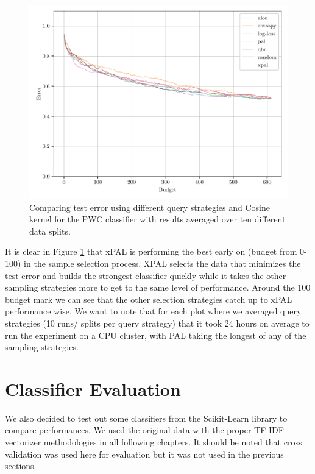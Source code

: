 \begin{figure}[ht]
    \centering
    \includegraphics[width=\scale\textwidth]{../img/plot_kernel_cos_averaged_test_results.pdf}
    \caption{Comparing test error using different query strategies and Cosine kernel for the PWC classifier with results averaged over ten different data splits.}
    \label{fig:cos_avg_test_results}
\end{figure}

It is clear in Figure \ref{fig:cos_avg_test_results} that xPAL is performing the best early on (budget from 0-100) in the sample selection process. XPAL selects the data that minimizes the test error and builds the strongest classifier quickly while it takes the other sampling strategies more to get to the same level of performance. Around the 100 budget mark we can see that the other selection strategies catch up to xPAL performance wise. We want to note that for each plot where we averaged query strategies (10 runs/ splits per query strategy) that it took 24 hours on average to run the experiment on a CPU cluster, with PAL taking the longest of any of the sampling strategies.

\clearpage

\section{Classifier Evaluation}
\label{sec:classifier_evaluation}

We also decided to test out some classifiers from the Scikit-Learn library to compare performances. We used the original data with the proper TF-IDF vectorizer methodologies in all following chapters. It should be noted that cross validation was used here for evaluation but it was not used in the previous sections.


